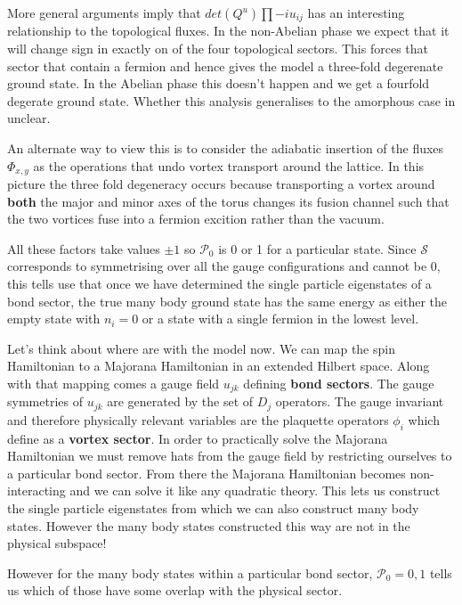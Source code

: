 More general
arguments\autocite{chungExplicitMonodromyMoore2007,oshikawaTopologicalDegeneracyNonAbelian2007}
imply that \(det(Q^u) \prod -i u_{ij}\) has an interesting relationship
to the topological fluxes. In the non-Abelian phase we expect that it
will change sign in exactly on of the four topological sectors. This
forces that sector that contain a fermion and hence gives the model a
three-fold degerenate ground state. In the Abelian phase this doesn't
happen and we get a fourfold degerate ground state. Whether this
analysis generalises to the amorphous case in unclear.

An alternate way to view this is to consider the adiabatic insertion of
the fluxes \(\Phi_{x,y}\) as the operations that undo vortex transport
around the lattice. In this picture the three fold degeneracy occurs
because transporting a vortex around \textbf{both} the major and minor
axes of the torus changes its fusion channel such that the two vortices
fuse into a fermion excition rather than the vacuum.

All these factors take values \(\pm 1\) so \(\mathcal{P}_0\) is 0 or 1
for a particular state. Since \(\mathcal{S}\) corresponds to
symmetrising over all the gauge configurations and cannot be 0, this
tells use that once we have determined the single particle eigenstates
of a bond sector, the true many body ground state has the same energy as
either the empty state with \(n_i = 0\) or a state with a single fermion
in the lowest level.

Let's think about where are with the model now. We can map the spin
Hamiltonian to a Majorana Hamiltonian in an extended Hilbert space.
Along with that mapping comes a gauge field \(u_{jk}\) defining
\textbf{bond sectors}. The gauge symmetries of \(u_{jk}\) are generated
by the set of \(D_j\) operators. The gauge invariant and therefore
physically relevant variables are the plaquette operators \(\phi_i\)
which define as a \textbf{vortex sector}. In order to practically solve
the Majorana Hamiltonian we must remove hats from the gauge field by
restricting ourselves to a particular bond sector. From there the
Majorana Hamiltonian becomes non-interacting and we can solve it like
any quadratic theory. This lets us construct the single particle
eigenstates from which we can also construct many body states. However
the many body states constructed this way are not in the physical
subspace!

However for the many body states within a particular bond sector,
\(\mathcal{P}_0 = 0,1\) tells us which of those have some overlap with
the physical sector.

